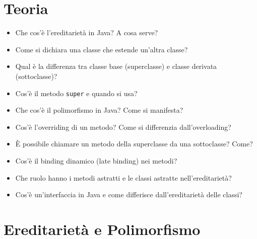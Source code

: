 \documentclass{article}
\begin{document}
\section{Teoria}

\begin{itemize}
    \item Che cos'è l'ereditarietà in Java? A cosa serve?
    \item Come si dichiara una classe che estende un'altra classe?
    \item Qual è la differenza tra classe base (superclasse) e classe derivata (sottoclasse)?
    \item Cos'è il metodo \texttt{super} e quando si usa?
    \item Che cos'è il polimorfismo in Java? Come si manifesta?
    \item Cos'è l'overriding di un metodo? Come si differenzia dall'overloading?
    \item È possibile chiamare un metodo della superclasse da una sottoclasse? Come?
    \item Cos'è il binding dinamico (late binding) nei metodi?
    \item Che ruolo hanno i metodi astratti e le classi astratte nell'ereditarietà?
    \item Cos'è un'interfaccia in Java e come differisce dall'ereditarietà delle classi?
\end{itemize}

\section{Ereditarietà e Polimorfismo}
\end{document}
